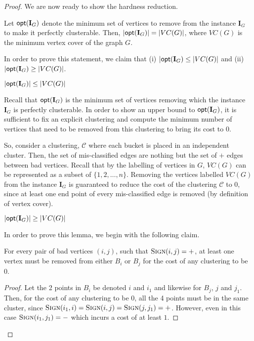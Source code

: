 \begin{proof}
We are now ready to show the hardness reduction.

\begin{lemma}
Let $\mathsf{opt} (\mathbf{I}_G)$ denote the minimum set of vertices to remove from the instance $\mathbf{I}_G$ to make it perfectly clusterable. Then, $|\mathsf{opt} (\mathbf{I}_G )| = |VC(G)|$, where $VC(G)$ is the minimum vertex cover of the graph $G$.
\end{lemma}

In order to prove this statement, we claim that (i) $|\mathsf{opt} (\mathbf{I}_G) \le |VC(G)|$ and (ii) $|\mathsf{opt} (\mathbf{I}_G) \ge |VC(G)|$.
\begin{claim}
$|\mathsf{opt} (\mathbf{I}_G)| \le |VC(G)|$
\end{claim}
Recall that $\mathsf{opt} (\mathbf{I}_G)$ is the minimum set of vertices removing which the instance $\mathbf{I}_G$ is perfectly clusterable. In order to show an upper bound to $\mathsf{opt} (\mathbf{I}_G)$, it is sufficient to fix an explicit clustering and compute the minimum number of vertices that need to be removed from this clustering to bring its cost to $0$.

So, consider a clustering, $\mathcal{C}$ where each bucket is placed in an independent cluster. Then, the set of mis-classified edges are nothing but the set of $+$ edges between bad vertices. Recall that by the labelling of vertices in $G$, $VC(G)$ can be represented as a subset of $\{1,2,\dots,n\}$. Removing the vertices labelled $VC(G)$ from the instance $\mathbf{I}_G$ is guaranteed to reduce the cost of the clustering $\mathcal{C}$ to $0$, since at least one end point of every mis-classified edge is removed (by definition of vertex cover).

\begin{claim} \label{lemma:01321923}
$|\mathsf{opt} (\mathbf{I}_G)| \ge |VC(G)|$
\end{claim}
In order to prove this lemma, we begin with the following claim.

\begin{claim}
For every pair of bad vertices $(i,j)$, such that $\textsc{Sign} (i,j) = +$, at least one vertex must be removed from either $B_i$ or $B_j$ for the cost of any clustering to be $0$.    
\end{claim}
\begin{proof}
Let the 2 points in $B_i$ be denoted $i$ and $i_1$ and likewise for $B_j$, $j$ and $j_1$. Then, for the cost of any clustering to be $0$, all the 4 points must be in the same cluster, since $\textsc{Sign}(i_1,i) = \textsc{Sign} (i,j) = \textsc{Sign}(j,j_1) = +$. However, even in this case $\textsc{Sign}(i_1,j_1) = -$ which incurs a cost of at least $1$.
\end{proof}


\end{proof}
